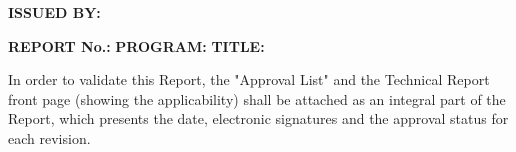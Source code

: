 \documentclass[12pt]{article} %
\numberwithin{figure}{section}
\numberwithin{table}{section}
\begin{document}

\thispagestyle{empty}

\textbf{ISSUED BY:}

\vspace{5.0cm}

\begin{flushright}
\begin{minipage}{0.75\textwidth}

\textbf{REPORT No.:} \linebreak \textbf{PROGRAM:} \linebreak \textbf{TITLE:} \linebreak

\end{minipage}
\end{flushright}

\vspace{3.0cm}

In order to validate this Report, the "Approval List" and the Technical Report front page (showing the applicability) shall be attached as an integral part of the Report, which presents the date, electronic signatures and the approval status for each revision.

\vfill


\newpage

\setcounter{page}{1}


\tableofcontents %

\newpage %


\listoffigures

\newpage %
\end{document}
